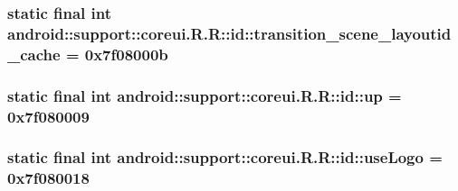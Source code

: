 \hypertarget{classandroid_1_1support_1_1coreui_1_1_r_1_1id_15d223b47ce569cf7821c7a771ad0c5d}{
\subsubsection[{transition\_\-scene\_\-layoutid\_\-cache}]{\setlength{\rightskip}{0pt plus 5cm}static final int android::support::coreui.R.R::id::transition\_\-scene\_\-layoutid\_\-cache = 0x7f08000b}}
\label{classandroid_1_1support_1_1coreui_1_1_r_1_1id_15d223b47ce569cf7821c7a771ad0c5d}


\hypertarget{classandroid_1_1support_1_1coreui_1_1_r_1_1id_c823ea08216d461fec761abb121387a6}{
\subsubsection[{up}]{\setlength{\rightskip}{0pt plus 5cm}static final int android::support::coreui.R.R::id::up = 0x7f080009}}
\label{classandroid_1_1support_1_1coreui_1_1_r_1_1id_c823ea08216d461fec761abb121387a6}


\hypertarget{classandroid_1_1support_1_1coreui_1_1_r_1_1id_89ebc7429524f4876044ed86233927e9}{
\subsubsection[{useLogo}]{\setlength{\rightskip}{0pt plus 5cm}static final int android::support::coreui.R.R::id::useLogo = 0x7f080018}}
\label{classandroid_1_1support_1_1coreui_1_1_r_1_1id_89ebc7429524f4876044ed86233927e9}


